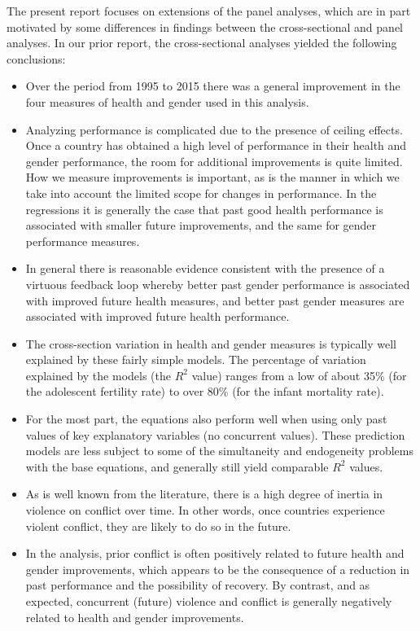 \documentclass[12pt]{article}
\begin{document}
The present report focuses on extensions of the panel analyses, which are in part motivated by some differences in findings between the cross-sectional and panel analyses. In our prior report, the cross-sectional analyses yielded the following conclusions:
\begin{itemize}
\item Over the period from 1995 to 2015 there was a general improvement in the four measures of health and gender used in this analysis.
\item Analyzing performance is complicated due to the presence of ceiling effects. Once a country has obtained a high level of performance in their health and gender performance, the room for additional improvements is quite limited. How we measure improvements is important, as is the manner in which we take into account the limited scope for changes in performance. In the regressions it is generally the case that past good health performance is associated with smaller future improvements, and the same for gender performance measures.
\item In general there is reasonable evidence consistent with the presence of a virtuous feedback loop whereby better past gender performance is associated with improved future health measures, and better past gender measures are associated with improved future health performance.
\item The cross-section variation in health and gender measures is typically well explained by these fairly simple models. The percentage of variation explained by the models (the $R^2$ value) ranges from a low of about 35\% (for the adolescent fertility rate) to over 80\% (for the infant mortality rate).
\item For the most part, the equations also perform well when using only past values of key explanatory variables (no concurrent values). These prediction models are less subject to some of the simultaneity and endogeneity problems with the base equations, and generally still yield comparable $R^2$ values.
\item As is well known from the literature, there is a high degree of inertia in violence on conflict over time. In other words, once countries experience violent conflict, they are likely to do so in the future.
\item In the analysis, prior conflict is often positively related to future health and gender improvements, which appears to be the consequence of a reduction in past performance and the possibility of recovery. By contrast, and as expected, concurrent (future) violence and conflict is generally negatively related to health and gender improvements.

\end{itemize}
\end{document}
